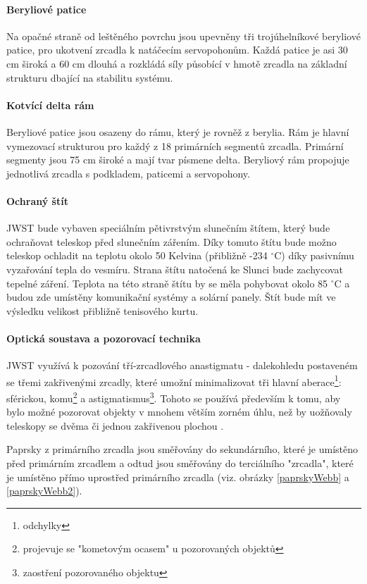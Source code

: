 \documentclass[a4paper,11pt]{article}
\begin{document}
\paragraph{Beryliové patice}
Na opačné straně od leštěného povrchu jsou upevněny tři trojúhelníkové beryliové patice, pro ukotvení zrcadla k natáčecím servopohonům. Každá patice je asi 30 cm široká a 60 cm dlouhá a rozkládá síly působící v hmotě zrcadla na základní strukturu dbající na stabilitu systému.

\paragraph{Kotvící delta rám}
Beryliové patice jsou osazeny do rámu, který je rovněž z berylia. Rám je hlavní vymezovací strukturou pro každý z 18 primárních segmentů zrcadla. Primární segmenty jsou 75 cm široké a mají tvar písmene delta. Beryliový rám propojuje jednotlivá zrcadla s podkladem, paticemi a servopohony.

\paragraph{Ochraný štít}
JWST bude vybaven speciálním pětivrstvým slunečním štítem, který bude ochraňovat teleskop před slunečním zářením. Díky tomuto štítu bude možno teleskop ochladit na teplotu okolo 50 Kelvina (přibližně -234 $^\circ$C) díky pasivnímu vyzařování tepla do vesmíru. Strana štítu natočená ke Slunci bude zachycovat tepelné záření. Teplota na této straně štítu by se měla pohybovat okolo 85 $^\circ$C a budou zde umístěny komunikační systémy a solární panely. Štít bude mít ve výsledku velikost přibližně tenisového kurtu.

\paragraph{Optická soustava a pozorovací technika}
JWST využívá k pozování tří-zrcadlového anastigmatu - dalekohledu postaveném se třemi zakřivenými zrcadly, které umožní minimalizovat tři hlavní aberace\footnote{odchylky}: sférickou, komu\footnote{projevuje se "kometovým ocasem" u pozorovaných objektů} a astigmatismus\footnote{zaostření pozorovaného objektu}. Tohoto se používá především k tomu, aby bylo možné pozorovat objekty v mnohem větším zorném úhlu, než by uožňovaly teleskopy se dvěma či jednou zakřivenou plochou \cite{wikipediaAnastigmat}.

Paprsky z primárního zrcadla jsou směřovány do sekundárního, které je umístěno před primárním zrcadlem a odtud jsou směřovány do terciálního "zrcadla", které je umístěno přímo uprostřed primárního zrcadla (viz. obrázky \ref{paprskyWebb} a \ref{paprskyWebb2}).
\end{document}
